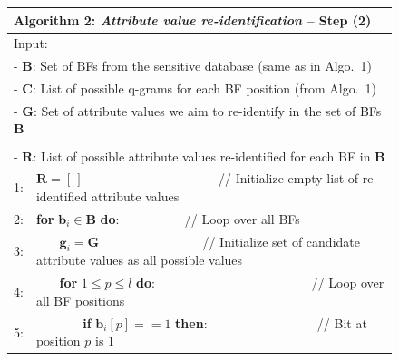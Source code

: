 \documentclass{llncs}
\begin{document}
\begin{figure}[t]
  \begin{center}
  \begin{scriptsize}
  \begin{tabular}{ll} \hline
\multicolumn{2}{l}{\textbf{Algorithm 2: \emph{Attribute value
  re-identification}} -- Step (2) } \\ \hline
\multicolumn{2}{l}{Input:} \\
\multicolumn{2}{l}{- $\mathbf{B}$: Set of BFs from the sensitive
  database (same as in Algo.~1)} \\
\multicolumn{2}{l}{- $\mathbf{C}$: List of possible q-grams for
  each BF position (from Algo.~1)} \\
  \multicolumn{2}{l}{- $\mathbf{G}$: Set of attribute values we aim
  to re-identify in the set of BFs $\mathbf{B}$} \\
\noalign{\smallskip}
\multicolumn{2}{l}{Output:} \\
\multicolumn{2}{l}{- $\mathbf{R}$: List of possible attribute values
  re-identified for each BF in $\mathbf{B}$} \\
\noalign{\smallskip}
  1:  & $\mathbf{R} = [\,]$ ~~~~~~~~~~~~~~~~~~~~ // Initialize empty
        list of re-identified attribute values \\
  2:  & \textbf{for} $\mathbf{b}_i \in \mathbf{B}$
        \textbf{do}: ~~~~~~~~~ // Loop over all BFs \\
  3:  & ~~~ $\mathbf{g}_i = \mathbf{G}$ ~~~~~~~~~~~~~~~ //
        Initialize set of candidate attribute values as all
        possible values \\        
  4:  & ~~~  \textbf{for} $1 \le p \le l$ \textbf{do}: 
        ~~~~~~~~~~~~~~~~~~~~~~~\, // Loop over all BF positions \\
  5:  & ~~~ ~~~ \textbf{if} $\mathbf{b}_i[p] == 1$ \textbf{then}:
        ~~~~~~~~~~~~~~~~ // Bit at position $p$ is 1 \\

\end{tabular}
\end{scriptsize}
\end{center}
\end{figure}
\end{document}
